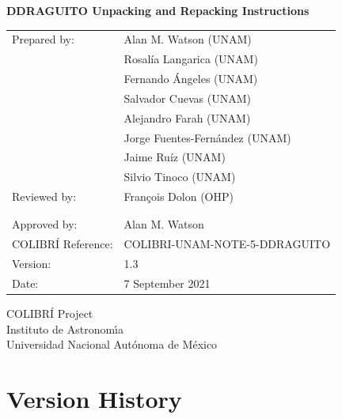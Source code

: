 \documentclass{article}
\begin{document}
\pagestyle{empty}

\begin{center}

{\Large \bfseries DDRAGUITO Unpacking and Repacking Instructions}

\vspace{2cm}

\begin{tabular}{ll}
Prepared by:&Alan M. Watson (UNAM)\\
&Rosalía Langarica (UNAM)\\
&Fernando Ángeles (UNAM)\\
&Salvador Cuevas (UNAM)\\
&Alejandro Farah (UNAM)\\
&Jorge Fuentes-Fernández (UNAM)\\
&Jaime Ruíz (UNAM)\\
&Silvio Tinoco (UNAM)\\
Reviewed by:&François Dolon (OHP)\\
&\\
&\\
Approved by:&Alan M. Watson\\
COLIBRÍ Reference:&COLIBRI-UNAM-NOTE-5-DDRAGUITO\\
Version:&1.3\\
Date:&7 September 2021\\
\end{tabular}

\vspace{\fill}

COLIBRÍ Project\\
Instituto de Astronom{\'\i}a\\
Universidad Nacional Aut\'onoma de M\'exico

\end{center}

\newpage


\pagestyle{plain}

\setcounter{tocdepth}{1}
\tableofcontents
\newpage




\clearpage
\section*{Version History}
\end{document}
